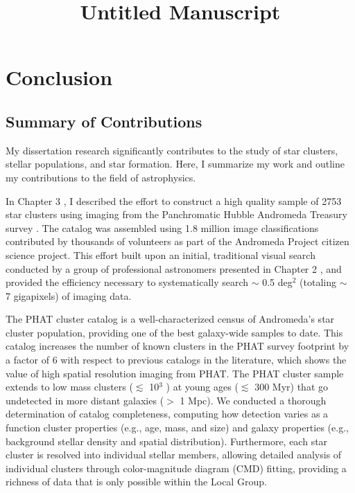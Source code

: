 \documentclass[11pt, titlepage, twoside]{article}
\begin{document}
\title{Untitled Manuscript}\author{}
\maketitle

\section{Conclusion}\label{MPSection:BA563B11-83D8-49CA-A74D-5F88E013894E}


\subsection{Summary of Contributions}\label{MPSection:C2297B6A-A829-43D1-831C-0B7D74417154}

My dissertation research significantly contributes to the study of star clusters, stellar populations, and star formation. Here, I summarize my work and outline my contributions to the field of astrophysics.

In Chapter 3 , I described the effort to construct a high quality sample of 2753 star clusters using imaging from the Panchromatic Hubble Andromeda Treasury survey . The catalog was assembled using 1.8 million image classifications contributed by thousands of volunteers as part of the Andromeda Project citizen science project. This effort built upon an initial, traditional visual search conducted by a group of professional astronomers presented in Chapter 2 , and provided the efficiency necessary to systematically search $\sim$ 0.5 deg$^2$ (totaling $\sim$ 7 gigapixels) of imaging data.

The PHAT cluster catalog is a well-characterized census of Andromeda's star cluster population, providing one of the best galaxy-wide samples to date. This catalog increases the number of known clusters in the PHAT survey footprint by a factor of 6 with respect to previous catalogs in the literature, which shows the value of high spatial resolution imaging from PHAT. The PHAT cluster sample extends to low mass clusters ($\lesssim$ 10$^3$ ) at young ages ($\lesssim$ 300 Myr) that go undetected in more distant galaxies ($>$ 1 Mpc). We conducted a thorough determination of catalog completeness, computing how detection varies as a function cluster properties (e.g., age, mass, and size) and galaxy properties (e.g., background stellar density and spatial distribution). Furthermore, each star cluster is resolved into individual stellar members, allowing detailed analysis of individual clusters through color-magnitude diagram (CMD) fitting, providing a richness of data that is only possible within the Local Group.
\end{document}
